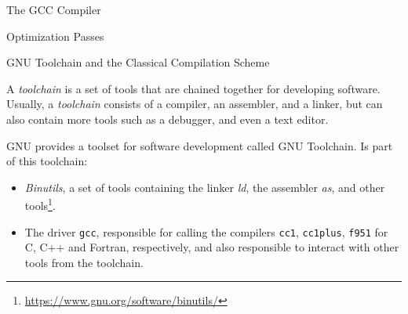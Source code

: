 \begin{section}{The GCC Compiler}
\begin{subsection}{Optimization Passes}
\end{subsection}

%
%


\begin{subsection}{GNU Toolchain and the Classical Compilation Scheme}

    A \textit{toolchain} is a set of tools that are chained together for
	developing software. Usually, a \textit{toolchain} consists of a
	compiler, an assembler, and a linker, but can also contain more tools
	such as a debugger, and even a text editor.

	GNU provides a toolset for software development called GNU Toolchain.
	Is part of this toolchain:

\begin{itemize}
    \item \textit{Binutils}, a set of tools containing the linker \textit{ld},
	the assembler \textit{as}, and other tools\footnote{\url{https://www.gnu.org/software/binutils/}}.

    \item The driver \texttt{gcc}, responsible for calling the compilers \texttt{cc1},
        \texttt{cc1plus}, \texttt{f951} for C, C++ and Fortran, respectively, and also
		responsible to interact with other tools from the toolchain.


\end{itemize}
\end{subsection}
\end{section}
